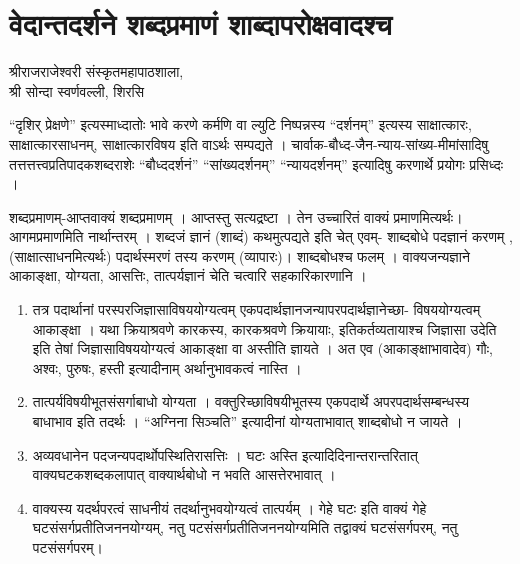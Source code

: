 \chapter{वेदान्तदर्शने शब्दप्रमाणं शाब्दापरोक्षवादश्च}

\begin{center}
\smallskip
 
श्रीराजराजेश्वरी संस्कृतमहापाठशाला,\\
श्री सोन्दा स्वर्णवल्ली, शिरसि
\addrule
\end{center}

“दृशिर् प्रेक्षणे” इत्यस्माध्दातोः भावे करणे कर्मणि वा ल्युटि निष्पन्नस्य “दर्शनम्” इत्यस्य साक्षात्कारः, साक्षात्कारसाधनम्, साक्षात्कारविषय इति वाऽर्थः सम्पद्यते । चार्वाक-बौध्द-जैन-न्याय-सांख्य-मीमांसादिषु तत्तत्तत्त्वप्रतिपादकशब्दराशेः “बौध्ददर्शनं” “सांख्यदर्शनम्” “न्यायदर्शनम्”  इत्यादिषु करणार्थे प्रयोगः प्रसिध्दः ।

शब्दप्रमाणम्-आप्तवाक्यं शब्दप्रमाणम् । आप्तस्तु सत्यद्रष्टा । तेन उच्चारितं वाक्यं प्रमाणमित्यर्थः। आगमप्रमाणमिति नार्थान्तरम् । शब्दजं ज्ञानं (शाब्दं) कथमुत्पद्यते इति चेत् एवम्- शाब्दबोधे पदज्ञानं करणम् , (साक्षात्साधनमित्यर्थः) पदार्थस्मरणं तस्य करणम् (व्यापारः)।  शाब्दबोधश्च फलम् । वाक्यजन्यज्ञाने आकाङ्क्षा, योग्यता, आसत्तिः, तात्पर्यज्ञानं चेति चत्वारि सहकारिकारणानि ।

\begin{enumerate}
\item तत्र पदार्थानां परस्परजिज्ञासाविषययोग्यत्वम् एकपदार्थज्ञानजन्यापरपदार्थज्ञानेच्छा- विषययोग्यत्वम् आकाङ्क्षा । यथा क्रियाश्रवणे कारकस्य, कारकश्रवणे क्रियायाः, इतिकर्तव्यतायाश्च जिज्ञासा उदेति इति तेषां जिज्ञासाविषययोग्यत्वं आकाङ्क्षा वा अस्तीति ज्ञायते । अत एव (आकाङ्क्षाभावादेव) गौः, अश्वः, पुरुषः, हस्ती इत्यादीनाम् अर्थानुभावकत्वं नास्ति ।
\item तात्पर्यविषयीभूतसंसर्गाबाधो योग्यता । वक्तुरिच्छाविषयीभूतस्य एकपदार्थे अपरपदार्थसम्बन्धस्य बाधाभाव इति तदर्थः । “अग्निना सिञ्चति” इत्यादीनां योग्यताभावात् शाब्दबोधो न जायते ।
\item अव्यवधानेन पदजन्यपदार्थोपस्थितिरासत्तिः । घटः अस्ति इत्यादिदिनान्तरान्तरितात् वाक्यघटकशब्दकलापात् वाक्यार्थबोधो न भवति आसत्तेरभावात् ।
\item वाक्यस्य यदर्थपरत्वं साधनीयं तदर्थानुभवयोग्यत्वं  तात्पर्यम् । गेहे घटः इति वाक्यं गेहे घटसंसर्गप्रतीतिजननयोग्यम्, नतु पटसंसर्गप्रतीतिजननयोग्यमिति तद्वाक्यं घटसंसर्गपरम्, नतु पटसंसर्गपरम्। 
\end{enumerate}

